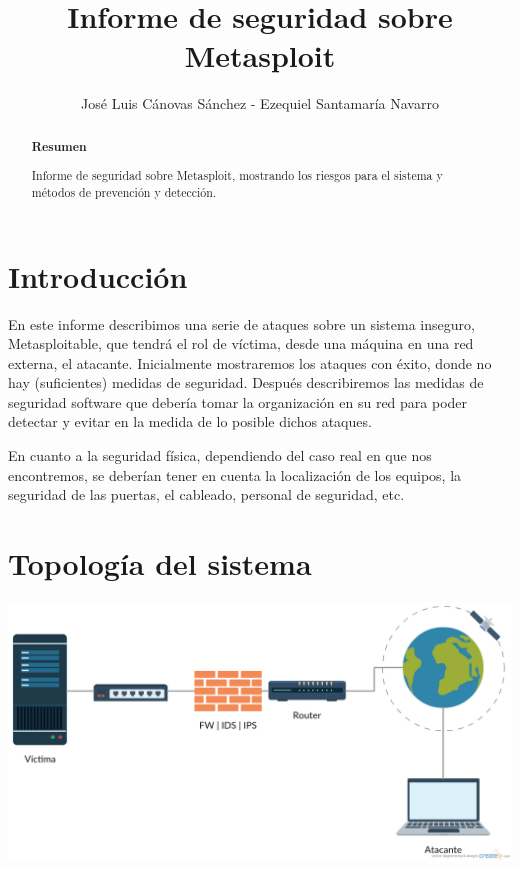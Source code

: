 \documentclass[a4paper,12pt]{scrartcl}
\title{Informe de seguridad sobre Metasploit}
\author{José Luis Cánovas Sánchez - Ezequiel Santamaría Navarro}
\begin{document}

\maketitle

\newpage


\setcounter{page}{1}

\begin{abstract}
\begin{center}
	\textbf{Resumen}
\end{center}

\vspace{10pt}

Informe de seguridad sobre Metasploit, mostrando los riesgos para el sistema y métodos de prevención y detección. 
\end{abstract}

\newpage

\tableofcontents

\newpage

\section{Introducción}


En este informe describimos una serie de ataques sobre un sistema inseguro, Metasploitable, que tendrá el rol de víctima, desde una máquina en una red externa, el atacante. Inicialmente mostraremos los ataques con éxito, donde no hay (suficientes) medidas de seguridad. Después describiremos las medidas de seguridad software que debería tomar la organización en su red para poder detectar y evitar en la medida de lo posible dichos ataques.

En cuanto a la seguridad física, dependiendo del caso real en que nos encontremos, se deberían tener en cuenta la localización de los equipos, la seguridad de las puertas, el cableado, personal de seguridad, etc.

\section{Topología del sistema}


\includegraphics[width=1\linewidth]{topoideal.png}
\end{document}

